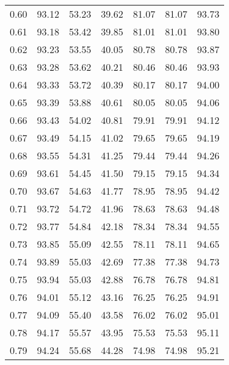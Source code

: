 \begin{tabular}{|c|c|c|c|c|c|c|}
      0.60 &     93.12 &     53.23 &      39.62 &   81.07 &      81.07 &         93.73 \\
      0.61 &     93.18 &     53.42 &      39.85 &   81.01 &      81.01 &         93.80 \\
      0.62 &     93.23 &     53.55 &      40.05 &   80.78 &      80.78 &         93.87 \\
      0.63 &     93.28 &     53.62 &      40.21 &   80.46 &      80.46 &         93.93 \\
      0.64 &     93.33 &     53.72 &      40.39 &   80.17 &      80.17 &         94.00 \\
      0.65 &     93.39 &     53.88 &      40.61 &   80.05 &      80.05 &         94.06 \\
      0.66 &     93.43 &     54.02 &      40.81 &   79.91 &      79.91 &         94.12 \\
      0.67 &     93.49 &     54.15 &      41.02 &   79.65 &      79.65 &         94.19 \\
      0.68 &     93.55 &     54.31 &      41.25 &   79.44 &      79.44 &         94.26 \\
      0.69 &     93.61 &     54.45 &      41.50 &   79.15 &      79.15 &         94.34 \\
      0.70 &     93.67 &     54.63 &      41.77 &   78.95 &      78.95 &         94.42 \\
      0.71 &     93.72 &     54.72 &      41.96 &   78.63 &      78.63 &         94.48 \\
      0.72 &     93.77 &     54.84 &      42.18 &   78.34 &      78.34 &         94.55 \\
      0.73 &     93.85 &     55.09 &      42.55 &   78.11 &      78.11 &         94.65 \\
      0.74 &     93.89 &     55.03 &      42.69 &   77.38 &      77.38 &         94.73 \\
      0.75 &     93.94 &     55.03 &      42.88 &   76.78 &      76.78 &         94.81 \\
      0.76 &     94.01 &     55.12 &      43.16 &   76.25 &      76.25 &         94.91 \\
      0.77 &     94.09 &     55.40 &      43.58 &   76.02 &      76.02 &         95.01 \\
      0.78 &     94.17 &     55.57 &      43.95 &   75.53 &      75.53 &         95.11 \\
      0.79 &     94.24 &     55.68 &      44.28 &   74.98 &      74.98 &         95.21 \\

\end{tabular}
